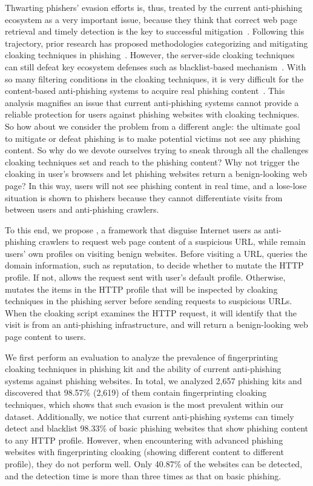 Thwarting phishers' evasion efforts is, thus, treated by the current anti-phishing ecosystem as a very important issue,
because they think that correct web page retrieval and timely detection is the key to successful mitigation~\cite{oest2020sunrise, zhang2021crawlphish}.
Following this trajectory, prior research has proposed methodologies categorizing and mitigating cloaking techniques in phishing~\cite{oest2018inside, oest2019phishfarm, zhang2021crawlphish}.
However, the server-side cloaking techniques can still defeat key ecosystem defenses such as blacklist-based mechanism~\cite{oest2019phishfarm}.
With so many filtering conditions in the cloaking techniques,
it is very difficult for the content-based anti-phishing systems to acquire real phishing content~\cite{oest2018inside, oest2020phishtime}.
This analysis magnifies an issue that current anti-phishing systems cannot provide a reliable protection for users against phishing websites with cloaking techniques.
So how about we consider the problem from a different angle:
the ultimate goal to mitigate or defeat phishing is to make potential victims not see any phishing content.
So why do we devote ourselves trying to sneak through all the challenges cloaking techniques set and reach to the phishing content?
Why not trigger the cloaking in user's browsers and let phishing websites return a benign-looking web page?
In this way, users will not see phishing content in real time, and a lose-lose situation is shown to phishers because they cannot differentiate visits from between users and anti-phishing crawlers.

To this end, we propose \spartacus, a framework that disguise Internet users as anti-phishing crawlers to request web page content of a suspicious URL, while remain users' own profiles on visiting benign websites.
Before visiting a URL, \spartacus queries the domain information, such as reputation, to decide whether to mutate the HTTP profile.
If not, \spartacus allows the request sent with user's default profile.
Otherwise, \spartacus mutates the items in the HTTP profile that will be inspected by cloaking techniques in the phishing server before sending requests to suspicious URLs.
When the cloaking script examines the HTTP request, it will identify that the visit is from an anti-phishing infrastructure, and will return a benign-looking web page content to users.

We first perform an evaluation to analyze the prevalence of fingerprinting cloaking techniques in phishing kit and the ability of current anti-phishing systems against phishing websites.  
In total, we analyzed 2,657 phishing kits and discovered that 98.57\% (2,619) of them contain fingerprinting cloaking techniques, which shows that such evasion is the most prevalent within our dataset.
Additionally, we notice that current anti-phishing systems can timely detect and blacklist 98.33\% of basic phishing websites that show phishing content to any HTTP profile.
However, when encountering with advanced phishing websites with fingerprinting cloaking (showing different content to different profile), they do not perform well.
Only 40.87\% of the websites can be detected, and the detection time is more than three times as that on basic phishing.

